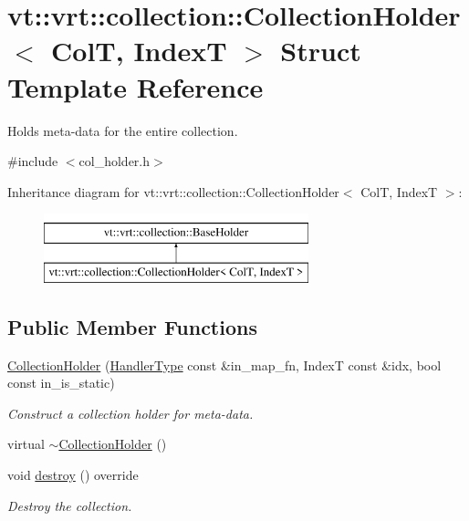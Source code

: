 \hypertarget{structvt_1_1vrt_1_1collection_1_1_collection_holder}{}\section{vt\+:\+:vrt\+:\+:collection\+:\+:Collection\+Holder$<$ ColT, IndexT $>$ Struct Template Reference}
\label{structvt_1_1vrt_1_1collection_1_1_collection_holder}


Holds meta-\/data for the entire collection.  




{\ttfamily \#include $<$col\+\_\+holder.\+h$>$}

Inheritance diagram for vt\+:\+:vrt\+:\+:collection\+:\+:Collection\+Holder$<$ ColT, IndexT $>$\+:\begin{figure}[H]
\begin{center}
\leavevmode
\includegraphics[height=2.000000cm]{structvt_1_1vrt_1_1collection_1_1_collection_holder}
\end{center}
\end{figure}
\subsection*{Public Member Functions}
\begin{DoxyCompactItemize}
\item 
\hyperlink{structvt_1_1vrt_1_1collection_1_1_collection_holder_a75bb95393ac580b3f330da43e295a47a}{Collection\+Holder} (\hyperlink{namespacevt_af64846b57dfcaf104da3ef6967917573}{Handler\+Type} const \&in\+\_\+map\+\_\+fn, IndexT const \&idx, bool const in\+\_\+is\+\_\+static)
\begin{DoxyCompactList}\small\item\em Construct a collection holder for meta-\/data. \end{DoxyCompactList}\item 
virtual \hyperlink{structvt_1_1vrt_1_1collection_1_1_collection_holder_a80360d38dc40e4bf2253288b01595de6}{$\sim$\+Collection\+Holder} ()
\item 
void \hyperlink{structvt_1_1vrt_1_1collection_1_1_collection_holder_a744d2a48f9f22db59b2705b3d3f3d1ca}{destroy} () override
\begin{DoxyCompactList}\small\item\em Destroy the collection. \end{DoxyCompactList}\end{DoxyCompactItemize}
